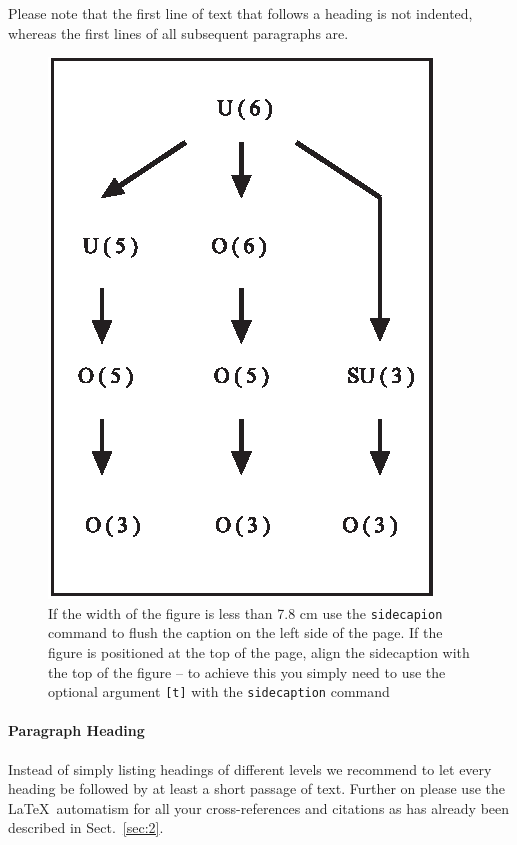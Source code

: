 \documentclass[graybox]{svmult}
\begin{document}
Please note that the first line of text that follows a heading is not indented, whereas the first lines of all subsequent paragraphs are.

%
\begin{figure}[b]
\sidecaption
\includegraphics[scale=.65]{figure}
%
%
\caption{If the width of the figure is less than 7.8 cm use the \texttt{sidecapion} command to flush the caption on the left side of the page. If the figure is positioned at the top of the page, align the sidecaption with the top of the figure -- to achieve this you simply need to use the optional argument \texttt{[t]} with the \texttt{sidecaption} command}
\label{fig:1}       %
\end{figure}


\paragraph{Paragraph Heading} %
Instead of simply listing headings of different levels we recommend to let every heading be followed by at least a short passage of text.  Further on please use the \LaTeX\ automatism for all your cross-references and citations as has already been described in Sect.~\ref{sec:2}.
\end{document}
